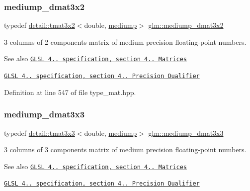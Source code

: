 \subsubsection{\texorpdfstring{mediump\+\_\+dmat3x2}{mediump\_dmat3x2}}
{\footnotesize\ttfamily typedef \hyperlink{structglm_1_1detail_1_1tmat3x2}{detail\+::tmat3x2}$<$double, \hyperlink{namespaceglm_a0f04f086094c747d227af4425893f545a6416f3ea0c9025fb21ed50c4d6620482}{mediump}$>$ \hyperlink{group__core__precision_gaff0060984716bcda68ff69ed27536bf6}{glm\+::mediump\+\_\+dmat3x2}}

3 columns of 2 components matrix of medium precision floating-\/point numbers.

\begin{DoxySeeAlso}{See also}
\href{http://www.opengl.org/registry/doc/GLSLangSpec.4.20.8.pdf}{\tt G\+L\+SL 4.. specification, section 4.. Matrices} 

\href{http://www.opengl.org/registry/doc/GLSLangSpec.4.20.8.pdf}{\tt G\+L\+SL 4.. specification, section 4.. Precision Qualifier} 
\end{DoxySeeAlso}


Definition at line 547 of file type\+\_\+mat.\+hpp.

\mbox{\label{group__core__precision_ga2f73508d8192390ca9f9b569f544fade}} 
\subsubsection{\texorpdfstring{mediump\+\_\+dmat3x3}{mediump\_dmat3x3}}
{\footnotesize\ttfamily typedef \hyperlink{structglm_1_1detail_1_1tmat3x3}{detail\+::tmat3x3}$<$double, \hyperlink{namespaceglm_a0f04f086094c747d227af4425893f545a6416f3ea0c9025fb21ed50c4d6620482}{mediump}$>$ \hyperlink{group__core__precision_ga2f73508d8192390ca9f9b569f544fade}{glm\+::mediump\+\_\+dmat3x3}}

3 columns of 3 components matrix of medium precision floating-\/point numbers.

\begin{DoxySeeAlso}{See also}
\href{http://www.opengl.org/registry/doc/GLSLangSpec.4.20.8.pdf}{\tt G\+L\+SL 4.. specification, section 4.. Matrices} 

\href{http://www.opengl.org/registry/doc/GLSLangSpec.4.20.8.pdf}{\tt G\+L\+SL 4.. specification, section 4.. Precision Qualifier} 
\end{DoxySeeAlso}


